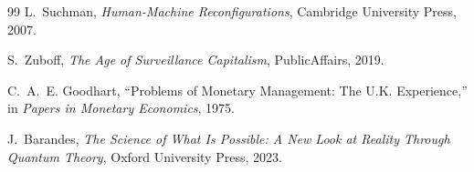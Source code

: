 \documentclass[12pt, a4paper]{article}
\begin{document}
\begin{thebibliography}{99}
L.~Suchman,
\emph{Human-Machine Reconfigurations},
Cambridge University Press, 2007.

S.~Zuboff,
\emph{The Age of Surveillance Capitalism},
PublicAffairs, 2019.

C.~A.~E. Goodhart,
``Problems of Monetary Management: The U.K. Experience,''
in \emph{Papers in Monetary Economics}, 1975.

J.~Barandes,
\emph{The Science of What Is Possible: A New Look at Reality Through Quantum Theory},
Oxford University Press, 2023.

\end{thebibliography}
\end{document}
